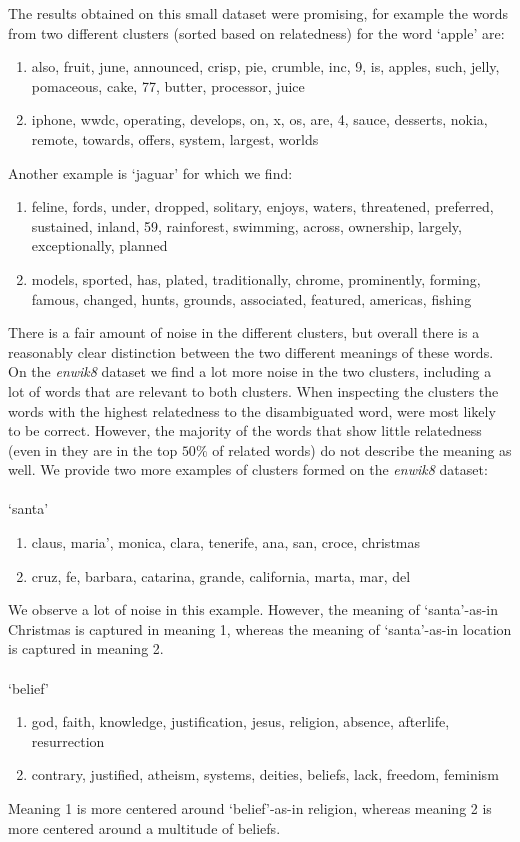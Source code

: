 \documentclass[11pt]{article}
\begin{document}
The results obtained on this small dataset were promising, for example the words from two different clusters  (sorted based on relatedness) for the word `apple' are: 
\begin{enumerate}
\item also, fruit, june, announced, crisp, pie, crumble, inc, 9, is, apples, such, jelly, pomaceous, cake, 77, butter, processor, juice
\item iphone, wwdc, operating, develops, on, x, os, are, 4, sauce, desserts, nokia, remote, towards, offers, system, largest, worlds
\end{enumerate}
Another example is `jaguar' for which we find: 
\begin{enumerate}
\item feline, fords, under, dropped, solitary, enjoys, waters, threatened, preferred, sustained, inland, 59, rainforest, swimming, across, ownership, largely, exceptionally, planned
\item models, sported, has, plated, traditionally, chrome, prominently, forming, famous, changed, hunts, grounds, associated, featured, americas, fishing
\end{enumerate}
There is a fair amount of noise in the different clusters, but overall there is a reasonably clear distinction between the two different meanings of these words.
On the \textit{enwik8} dataset we find a lot more noise in the two clusters, including a lot of words that are relevant to both clusters. When inspecting the clusters the words with the highest relatedness to the disambiguated word, were most likely to be correct. However, the majority of the words that show little relatedness (even in they are in the top $50\%$ of related words) do not describe the meaning as well. We provide two more examples of clusters formed on the \textit{enwik8} dataset:\\\\
`santa'
\begin{enumerate}
\item claus, maria', monica, clara, tenerife, ana, san, croce, christmas
\item cruz, fe, barbara, catarina, grande, california, marta, mar, del
\end{enumerate}
We observe a lot of noise in this example. However, the meaning of `santa'-as-in Christmas is captured in meaning 1, whereas the meaning of `santa'-as-in location is captured in meaning 2. \\\\
`belief'
\begin{enumerate}
\item god, faith, knowledge, justification, jesus, religion, absence, afterlife, resurrection
\item contrary, justified, atheism, systems, deities, beliefs, lack, freedom, feminism
\end{enumerate}
Meaning 1 is more centered around `belief'-as-in religion, whereas meaning 2 is more centered around a multitude of beliefs. 
\end{document}
